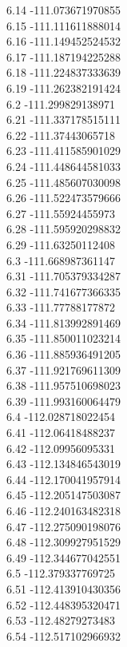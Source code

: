 {6.14	-111.073671970855\\
6.15	-111.111611888014\\
6.16	-111.149452524532\\
6.17	-111.187194225288\\
6.18	-111.224837333639\\
6.19	-111.262382191424\\
6.2	-111.299829138971\\
6.21	-111.337178515111\\
6.22	-111.37443065718\\
6.23	-111.411585901029\\
6.24	-111.448644581033\\
6.25	-111.485607030098\\
6.26	-111.522473579666\\
6.27	-111.55924455973\\
6.28	-111.595920298832\\
6.29	-111.63250112408\\
6.3	-111.668987361147\\
6.31	-111.705379334287\\
6.32	-111.741677366335\\
6.33	-111.77788177872\\
6.34	-111.813992891469\\
6.35	-111.850011023214\\
6.36	-111.885936491205\\
6.37	-111.921769611309\\
6.38	-111.957510698023\\
6.39	-111.993160064479\\
6.4	-112.028718022454\\
6.41	-112.06418488237\\
6.42	-112.09956095331\\
6.43	-112.134846543019\\
6.44	-112.170041957914\\
6.45	-112.205147503087\\
6.46	-112.240163482318\\
6.47	-112.275090198076\\
6.48	-112.309927951529\\
6.49	-112.344677042551\\
6.5	-112.379337769725\\
6.51	-112.413910430356\\
6.52	-112.448395320471\\
6.53	-112.48279273483\\
6.54	-112.517102966932\\
}
